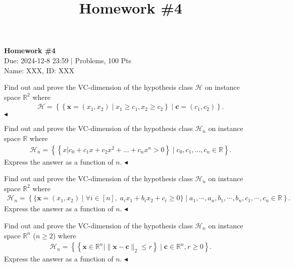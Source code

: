 \documentclass[11pt]{article}
\title{Homework \#4}
\newenvironment{problem}[2][Problem]{\begin{trivlist}
\item[\hskip \labelsep {\bfseries #1}\hskip \labelsep {\bfseries #2.}]}{\hfill$\blacktriangleleft$\end{trivlist}}
\begin{document}
\pagestyle{fancy}
\chead{}

\begin{center}
    {\LARGE \bf Homework \#4}\\
    {Due: 2024-12-8 23:59 \quad$|$ Problems, 100 Pts}\\
    {Name: XXX, ID: XXX}            %
\end{center}



\begin{problem}{1 (10')} Find out and prove the VC-dimension of the hypothesis class $\mathcal{H}$ on instance space $\mathbb{R}^2$ where
\begin{align*}
    \mathcal{H}=\left\{\left\{\bm x=(x_1,x_2)\mid x_1\geq c_1, x_2\geq c_2\right\}\mid \bm c=(c_1,c_2)\right\}.
\end{align*}
\end{problem}


\begin{problem}{2 (10')} Find out and prove the VC-dimension of the hypothesis class $\mathcal{H}_n$ on instance space $\mathbb{R}$ where
    \begin{align*}
        \mathcal{H}_n=\left\{\left\{x|c_0+c_1x+c_2x^2+...+c_nx^n>0\right\}\mid c_0,c_1,...,c_n\in\mathbb{R}\right\}.
    \end{align*}
    Express the answer as a function of $n$.
\end{problem}


\begin{problem}{3 (16')} Find out and prove the VC-dimension of the hypothesis class $\mathcal{H}_n$ on instance space $\mathbb{R}^2$ where
\begin{align*}
    \mathcal{H}_n=\left\{\{\bm x = (x_1, x_2)\mid \forall i\in [n], \; a_ix_1 + b_ix_2 + c_i \geq 0\} \mid a_1, \cdots, a_n, b_1, \cdots, b_n, c_1, \cdots, c_n\in \mathbb{R}\right\}.
\end{align*}
Express the answer as a function of $n$.
\end{problem}


\begin{problem}{4 (16')}
Find out and prove the VC-dimension of the hypothesis class $\mathcal{H}_n$ on instance space $\mathbb{R}^n$ ($n\geq 2$) where
\begin{align*}
\mathcal{H}_n=\left\{\left\{\bm x\in\mathbb{R}^n\mid \|\bm x-\bm c\|_2\leq r\right\}\mid \bm c\in\mathbb{R}^n, r\geq 0\right\}.
\end{align*}
Express the answer as a function of $n$.
\end{problem}
\end{document}
